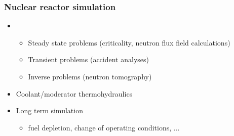 \begin{frame}
	\frametitle{Nuclear reactor simulation }
	\begin{itemize}
		\item {}
			\begin{itemize}
				\item Steady state problems (criticality, neutron flux field calculations)
				\item Transient problems (accident analyses)
				\item Inverse problems (neutron tomography)
			\end{itemize}\pause
		\item Coolant/moderator thermohydraulics
		\item Long term simulation
			\begin{itemize}
				\item fuel depletion, change of operating conditions, ...\\[1.5em]
			\end{itemize}		
	\end{itemize}
	\hfill\color{dkred}{\large fully coupled}\hfill\hbox{}
\end{frame}
